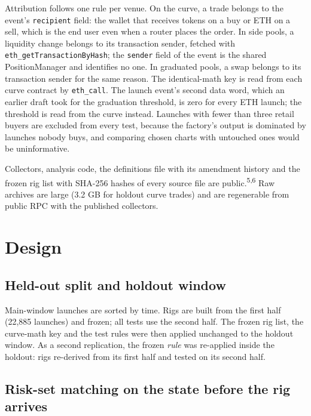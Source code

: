 \documentclass{ledger}
\newcommand{\n}[1]{\textsuperscript{#1}}
\begin{document}
Attribution follows one rule per venue. On the curve, a trade belongs to the event's \texttt{recipient} field: the wallet that receives tokens on a buy or ETH on a sell, which is the end user even when a router places the order. In side pools, a liquidity change belongs to its transaction sender, fetched with \texttt{eth\_getTransactionByHash}; the \texttt{sender} field of the event is the shared PositionManager and identifies no one. In graduated pools, a swap belongs to its transaction sender for the same reason. The identical-math key is read from each curve contract by \texttt{eth\_call}. The launch event's second data word, which an earlier draft took for the graduation threshold, is zero for every ETH launch; the threshold is read from the curve instead. Launches with fewer than three retail buyers are excluded from every test, because the factory's output is dominated by launches nobody buys, and comparing chosen charts with untouched ones would be uninformative.

Collectors, analysis code, the definitions file with its amendment history and the frozen rig list with SHA-256 hashes of every source file are public.\n{5,6} Raw archives are large (3.2 GB for holdout curve trades) and are regenerable from public RPC with the published collectors.

\section{Design}\label{design}

\subsection{Held-out split and holdout window}

Main-window launches are sorted by time. Rigs are built from the first half (22,885 launches) and frozen; all tests use the second half. The frozen rig list, the curve-math key and the test rules were then applied unchanged to the holdout window. As a second replication, the frozen \emph{rule} was re-applied inside the holdout: rigs re-derived from its first half and tested on its second half.

\subsection{Risk-set matching on the state before the rig arrives}
\end{document}
